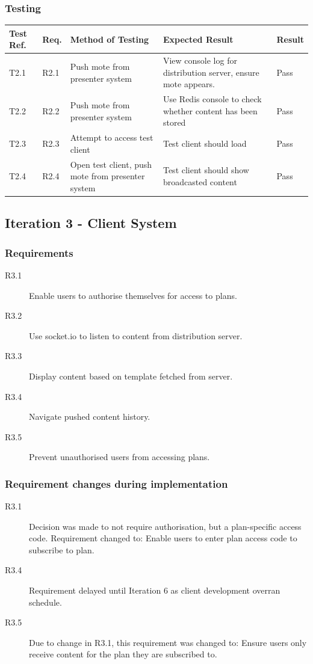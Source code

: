 \documentclass[a4papert,11pt,notitlepage]{article}
\begin{document}
\begin{appendices}
\subsubsection{Testing}
\begin{tabular}{p{30pt} | p{25pt} | p{140pt} | p{140pt} || p{90pt}}
Test Ref. & Req. & Method of Testing & Expected Result & Result \\ \hline
T2.1 & R2.1 & Push mote from presenter system & View console log for distribution server, ensure mote appears. & Pass \\
T2.2 & R2.2 & Push mote from presenter system & Use Redis console to check whether content has been stored & Pass \\
T2.3 & R2.3 & Attempt to access test client & Test client should load & Pass \\
T2.4 & R2.4 & Open test client, push mote from presenter system & Test client should show broadcasted content & Pass \\
\end{tabular}

\subsection{Iteration 3 - Client System}
\subsubsection{Requirements}
\begin{description}
\item[R3.1] Enable users to authorise themselves for access to plans.
\item[R3.2] Use socket.io to listen to content from distribution server.
\item[R3.3] Display content based on template fetched from server.
\item[R3.4] Navigate pushed content history.
\item[R3.5] Prevent unauthorised users from accessing plans.
\end{description}

\subsubsection{Requirement changes during implementation}
\begin{description}
\item[R3.1] Decision was made to not require authorisation, but a plan-specific access code. Requirement changed to: Enable users to enter plan access code to subscribe to plan.
\item[R3.4] Requirement delayed until Iteration 6 as client development overran schedule.
\item[R3.5] Due to change in R3.1, this requirement was changed to: Ensure users only receive content for the plan they are subscribed to.
\end{description}


\end{appendices}
\end{document}
